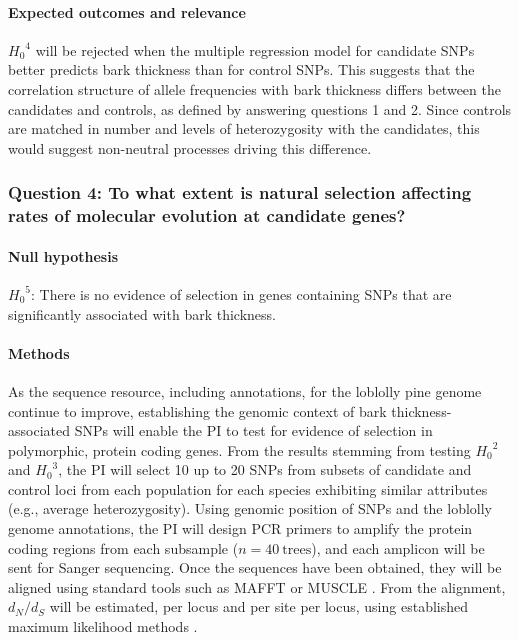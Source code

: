 \paragraph{Expected outcomes and relevance} ${H_0}^4$ will be rejected when the multiple regression model for candidate 
SNPs better predicts bark thickness than for control SNPs. This suggests that the correlation structure of allele frequencies 
with bark thickness differs between the candidates and controls,  as defined by answering questions 1 and 2. Since controls 
are matched in number and levels of heterozygosity with the candidates, this would suggest non-neutral processes driving 
this difference.

\subsubsection*{Question 4: To what extent is natural selection affecting rates of molecular evolution at candidate genes?}

\paragraph{Null hypothesis} ${H_0}^5$: There is no evidence of selection in genes containing SNPs that are significantly associated 
with bark thickness.

\paragraph{Methods} As the sequence resource, including annotations, for the loblolly pine genome continue to improve, 
establishing the genomic context of bark thickness-associated SNPs will enable the PI to test for evidence of selection in 
polymorphic, protein coding genes.  From the results stemming from testing ${H_0}^2$ and ${H_0}^3$, the PI will select 
10 up to 20 SNPs from subsets of candidate and control loci from each population for each species exhibiting similar attributes 
(e.g., average heterozygosity).   Using genomic position of SNPs and the loblolly genome annotations, the PI will design 
PCR primers to amplify the protein coding regions from each subsample ($n = 40\ \text{trees}$), and each amplicon will be 
sent for Sanger sequencing.  Once the sequences have been obtained, they will be aligned using standard tools such as 
MAFFT \citep{Katoh:2005ia} or MUSCLE \citep{Edgar:2004ic}.  From the alignment, $d_N/d_S$ will be 
estimated, per locus and per site per locus, using established maximum likelihood methods \citep{Yang:2007ki}.

